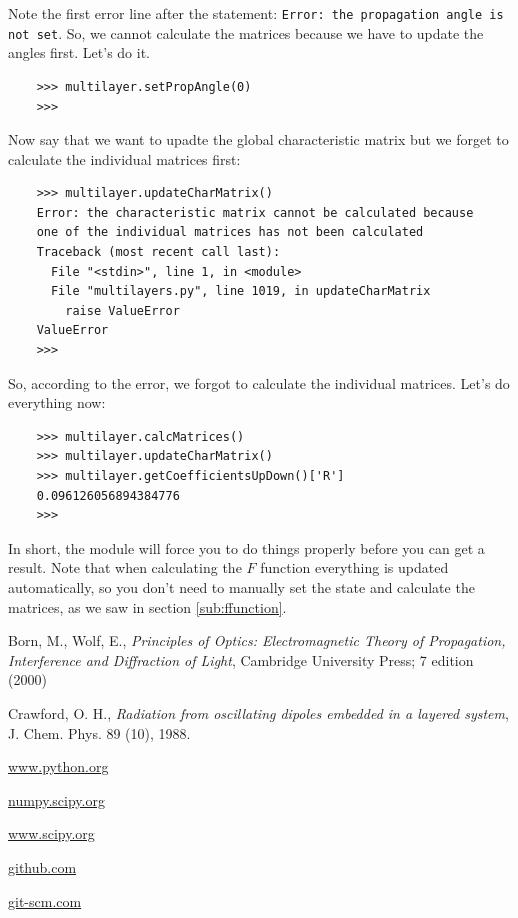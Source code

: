 \documentclass[a4paper,11pt,aps,final]{revtex4}
\begin{document}
Note the first error line after the statement: \texttt{Error: the propagation angle is not set}. So, we cannot calculate the matrices because we have to update the angles first. Let's do it.
\begin{verbatim}
    >>> multilayer.setPropAngle(0)
    >>>
\end{verbatim}

Now say that we want to upadte the global characteristic matrix but we forget to calculate the individual matrices first:
\begin{verbatim}
    >>> multilayer.updateCharMatrix()
    Error: the characteristic matrix cannot be calculated because
    one of the individual matrices has not been calculated
    Traceback (most recent call last):
      File "<stdin>", line 1, in <module>
      File "multilayers.py", line 1019, in updateCharMatrix
        raise ValueError
    ValueError
    >>>
\end{verbatim}

So, according to the error, we forgot to calculate the individual matrices. Let's do everything now:
\begin{verbatim}
    >>> multilayer.calcMatrices()
    >>> multilayer.updateCharMatrix()
    >>> multilayer.getCoefficientsUpDown()['R']
    0.096126056894384776
    >>>
\end{verbatim}

In short, the module will force you to do things properly before you can get a result. Note that when calculating the $F$ function everything is updated automatically, so you don't need to manually set the state and calculate the matrices, as we saw in section \ref{sub:ffunction}.

\begin{thebibliography}{9}
 Born, M., Wolf, E., \textit{Principles of Optics: Electromagnetic Theory of Propagation, Interference and Diffraction of Light}, Cambridge University Press; 7 edition (2000)

 Crawford, O. H., \textit{Radiation from oscillating dipoles embedded in a layered system}, J. Chem. Phys. 89 (10), 1988.

 \url{www.python.org}

 \url{numpy.scipy.org}

 \url{www.scipy.org}

 \url{github.com}

 \url{git-scm.com}

\end{thebibliography}
\end{document}
